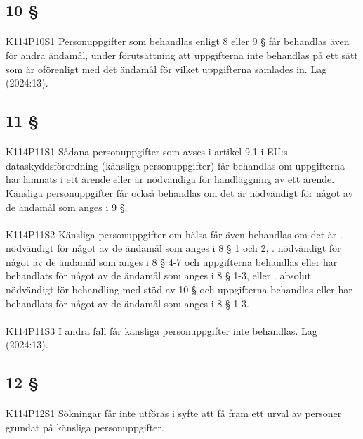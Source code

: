 \documentclass[a4paper,notitlepage,openany,10pt]{book}
\begin{document}
\subsection*{10 §}
\paragraph*{}
{\tiny K114P10S1}
Personuppgifter som behandlas enligt 8 eller 9 § får behandlas även för andra ändamål, under förutsättning att uppgifterna inte behandlas på ett sätt som är oförenligt med det ändamål för vilket uppgifterna samlades in.
Lag (2024:13).
\subsection*{11 §}
\paragraph*{}
{\tiny K114P11S1}
Sådana personuppgifter som avses i artikel 9.1 i EU:s dataskyddsförordning (känsliga personuppgifter) får behandlas om uppgifterna har lämnats i ett ärende eller är nödvändiga för handläggning av ett ärende. Känsliga personuppgifter får också behandlas om det är nödvändigt för något av de ändamål som anges i 9 §.
\paragraph*{}
{\tiny K114P11S2}
Känsliga personuppgifter om hälsa får även behandlas om det är
. nödvändigt för något av de ändamål som anges i 8 § 1 och 2,
. nödvändigt för något av de ändamål som anges i 8 § 4-7 och uppgifterna behandlas eller har behandlats för något av de ändamål som anges i 8 § 1-3, eller
. absolut nödvändigt för behandling med stöd av 10 § och uppgifterna behandlas eller har behandlats för något av de ändamål som anges i 8 § 1-3.
\paragraph*{}
{\tiny K114P11S3}
I andra fall får känsliga personuppgifter inte behandlas.
Lag (2024:13).
\subsection*{12 §}
\paragraph*{}
{\tiny K114P12S1}
Sökningar får inte utföras i syfte att få fram ett urval av personer grundat på känsliga personuppgifter.
\end{document}

